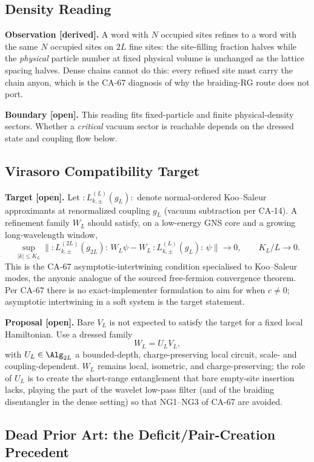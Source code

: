 \subsection{Density Reading}

\textbf{Observation [derived].}  A word with \(N\) occupied sites refines to a
word with the same \(N\) occupied sites on \(2L\) fine sites: the site-filling
fraction halves while the \emph{physical} particle number at fixed physical
volume is unchanged as the lattice spacing halves.  Dense chains cannot do
this: every refined site must carry the chain anyon, which is the CA-67
diagnosis of why the braiding-RG route does not port.

\textbf{Boundary [open].}  This reading fits fixed-particle and finite
physical-density sectors.  Whether a \emph{critical} vacuum sector is
reachable depends on the dressed state and coupling flow below.

\subsection{Virasoro Compatibility Target}

\textbf{Target [open].}  Let \({:}L^{(L)}_{k,\pm}(g_L){:}\) denote
normal-ordered Koo--Saleur approximants at renormalized coupling \(g_L\)
(vacuum subtraction per CA-14).  A refinement family \(W_L\) should satisfy,
on a low-energy GNS core and a growing long-wavelength window,
\[
  \sup_{|k|\le K_L}
  \bigl\|
    {:}L^{(2L)}_{k,\pm}(g_{2L}){:}\,W_L\psi
    -W_L\,{:}L^{(L)}_{k,\pm}(g_L){:}\,\psi
  \bigr\|\longrightarrow0,
  \qquad K_L/L\to0.
\]
This is the CA-67 asymptotic-intertwining condition specialised to Koo--Saleur
modes, the anyonic analogue of the sourced free-fermion convergence theorem.
Per CA-67 there is no exact-implementer formulation to aim for when
\(c\neq0\); asymptotic intertwining in a soft system is the target statement.

\textbf{Proposal [open].}  Bare \(V_L\) is not expected to satisfy the target
for a fixed local Hamiltonian.  Use a dressed family
\[
  W_L=U_LV_L,
\]
with \(U_L\in\Alg_{2L}\) a bounded-depth, charge-preserving local circuit,
scale- and coupling-dependent.  \(W_L\) remains local, isometric, and
charge-preserving; the role of \(U_L\) is to create the short-range
entanglement that bare empty-site insertion lacks, playing the part of the
wavelet low-pass filter (and of the braiding disentangler in the dense
setting) so that NG1--NG3 of CA-67 are avoided.

\subsection{Dead Prior Art: the Deficit/Pair-Creation Precedent}

